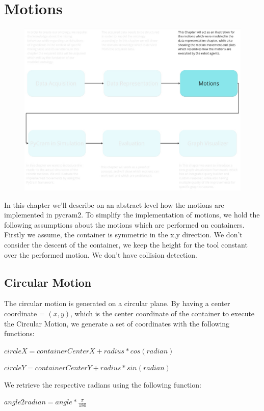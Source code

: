 \chapter{Motions}
\label{chap:Motions}
\begin{figure}[H]
    \includegraphics[scale=0.3]{Graphics/overview_3.jpg}
\end{figure}
In this chapter we'll describe on an abstract level how the motions are implemented in pycram2.
To simplify the implementation of motions, we hold the following assumptions about the motions which are performed on containers.
Firstly we assume, the container is symmetric in the x,y direction. We don't consider the descent of the container, we keep the height for the tool
constant over the performed motion. We don't have collision detection.

\section{Circular Motion}
The circular motion is generated on a circular plane. 
By having a center coordinate = $(x,y)$, which is the center coordinate of 
the container to execute the Circular Motion, we generate a set of coordinates
with the following functions: 

$circleX = containerCenterX + radius * cos(radian)$

$circleY = containerCenterY + radius * sin(radian)$

We retrieve the respective radians using the following function:

$ angle2radian = angle * \frac{\pi}{180} $

